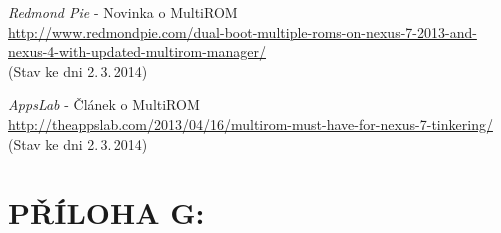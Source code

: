 \documentclass[12pt, a4paper, oneside]{article}
\newcommand{\It}{\textit}  %
\begin{document}
\begin{thebibliography}{99}
     \It{Redmond Pie} - Novinka o MultiROM\\
    \url{http://www.redmondpie.com/dual-boot-multiple-roms-on-nexus-7-2013-and-nexus-4-with-updated-multirom-manager/}\\
    (Stav ke dni 2.\,3.\,2014)

     \It{AppsLab} - Článek o MultiROM\\
    \url{http://theappslab.com/2013/04/16/multirom-must-have-for-nexus-7-tinkering/}\\
    (Stav ke dni 2.\,3.\,2014)

\end{thebibliography}

\newpage
\section*{PŘÍLOHA G:}
~
\listoffigures   %
\end{document}

